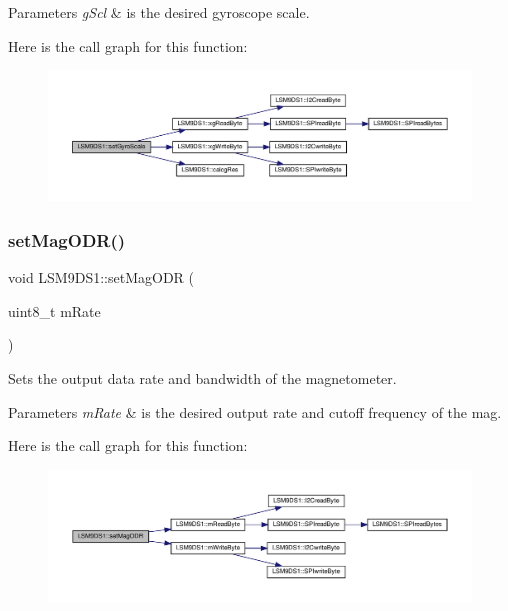 \begin{DoxyParams}{Parameters}
{\em g\+Scl} & is the desired gyroscope scale. \\
\hline
\end{DoxyParams}
Here is the call graph for this function\+:\nopagebreak
\begin{figure}[H]
\begin{center}
\leavevmode
\includegraphics[width=350pt]{classLSM9DS1_a115d304ebcdc8c701f3e5a5d397250aa_cgraph}
\end{center}
\end{figure}
\mbox{\label{classLSM9DS1_a8bc672fba680edc468a643fd58046b41}} 
\subsubsection{\texorpdfstring{set\+Mag\+O\+D\+R()}{setMagODR()}}
{\footnotesize\ttfamily void L\+S\+M9\+D\+S1\+::set\+Mag\+O\+DR (\begin{DoxyParamCaption}\item[{uint8\+\_\+t}]{m\+Rate }\end{DoxyParamCaption})}



Sets the output data rate and bandwidth of the magnetometer. 


\begin{DoxyParams}{Parameters}
{\em m\+Rate} & is the desired output rate and cutoff frequency of the mag. \\
\hline
\end{DoxyParams}
Here is the call graph for this function\+:\nopagebreak
\begin{figure}[H]
\begin{center}
\leavevmode
\includegraphics[width=350pt]{classLSM9DS1_a8bc672fba680edc468a643fd58046b41_cgraph}
\end{center}
\end{figure}
\mbox{\label{classLSM9DS1_ad7604159a07b0d088cdfb6ba4a0093b0}} 
